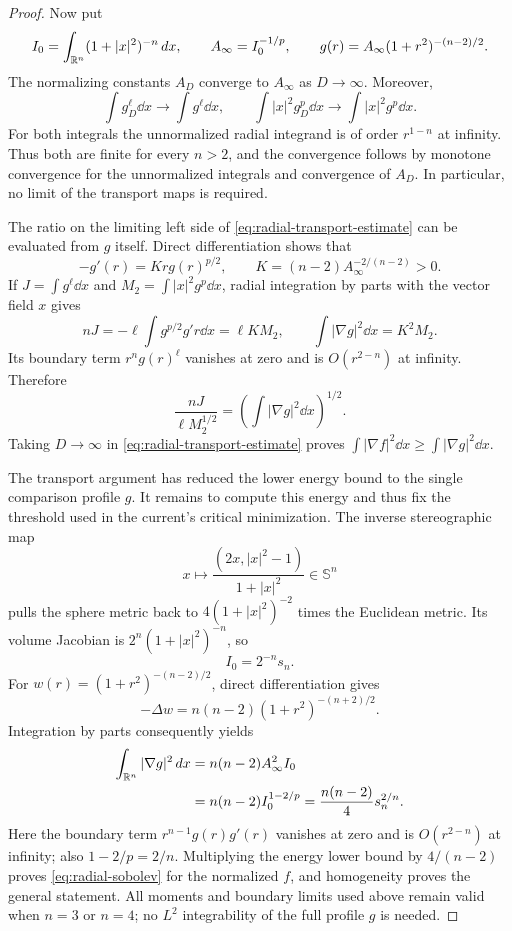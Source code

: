 \begin{proof}
Now put
\[
 I_0=\int_{\mathbb R^n}(1+|x|^2)^{-n}\,d x,
 \qquad A_\infty=I_0^{-1/p},\qquad
 g(r)=A_\infty(1+r^2)^{-(n-2)/2}.
\]
The normalizing constants $A_D$ converge to $A_\infty$ as
$D\to\infty$.  Moreover,
\[
 \int g_D^\ell\dd x\longrightarrow\int g^\ell\dd x,
 \qquad
 \int|x|^2g_D^p\dd x\longrightarrow\int|x|^2g^p\dd x.
\]
For both integrals the unnormalized radial integrand is of order
$r^{1-n}$ at infinity.  Thus both are finite for every $n>2$, and
the convergence follows by monotone convergence for the
unnormalized integrals and convergence of $A_D$.
In particular, no limit of the transport maps is required.

The ratio on the limiting left side of
\eqref{eq:radial-transport-estimate} can be evaluated from $g$ itself.
Direct differentiation shows that
\[
 -g'(r)=Krg(r)^{p/2},\qquad
 K=(n-2)A_\infty^{-2/(n-2)}>0.
\]
If $J=\int g^\ell\dd x$ and $M_2=\int|x|^2g^p\dd x$, radial
integration by parts with the vector field $x$ gives
\[
 nJ=-\ell\int g^{p/2}g'r\dd x=\ell K M_2,
 \qquad \int|\nabla g|^2\dd x=K^2M_2.
\]
Its boundary term $r^ng(r)^\ell$ vanishes at zero and is
$O(r^{2-n})$ at infinity.  Therefore
\begin{equation}
 \frac{nJ}{\ell M_2^{1/2}}
    =\left(\int|\nabla g|^2\dd x\right)^{1/2}.
 \label{eq:bubble-transport-ratio}
\end{equation}
Taking $D\to\infty$ in \eqref{eq:radial-transport-estimate} proves
$\int|\nabla f|^2\dd x\ge\int|\nabla g|^2\dd x$.

The transport argument has reduced the lower energy bound to the
single comparison profile $g$. It remains to compute this energy and
thus fix the threshold used in the current's critical minimization.
The inverse stereographic map
\[
 x\longmapsto\frac{(2x,|x|^2-1)}{1+|x|^2}\in\mathbb S^n
\]
pulls the sphere metric back to $4(1+|x|^2)^{-2}$ times the Euclidean
metric.  Its volume Jacobian is $2^n(1+|x|^2)^{-n}$, so
\begin{equation}
 I_0=2^{-n}s_n.
 \label{eq:stereographic-integral}
\end{equation}
For $w(r)=(1+r^2)^{-(n-2)/2}$, direct differentiation gives
\[
 -\Delta w=n(n-2)(1+r^2)^{-(n+2)/2}.
\]
Integration by parts consequently yields
\begin{align*}
 \int_{\mathbb R^n}|\nabla g|^2\,d x
 &=n(n-2)A_\infty^2I_0\\
 &=n(n-2)I_0^{1-2/p}
   =\frac{n(n-2)}4s_n^{2/n}.
\end{align*}
Here the boundary term $r^{n-1}g(r)g'(r)$ vanishes at zero and is
$O(r^{2-n})$ at infinity; also $1-2/p=2/n$.
Multiplying the energy lower bound by $4/(n-2)$ proves
\eqref{eq:radial-sobolev} for the normalized $f$, and homogeneity
proves the general statement.  All moments and boundary limits
used above remain valid when $n=3$ or $n=4$; no $L^2$ integrability
of the full profile $g$ is needed.


\end{proof}
